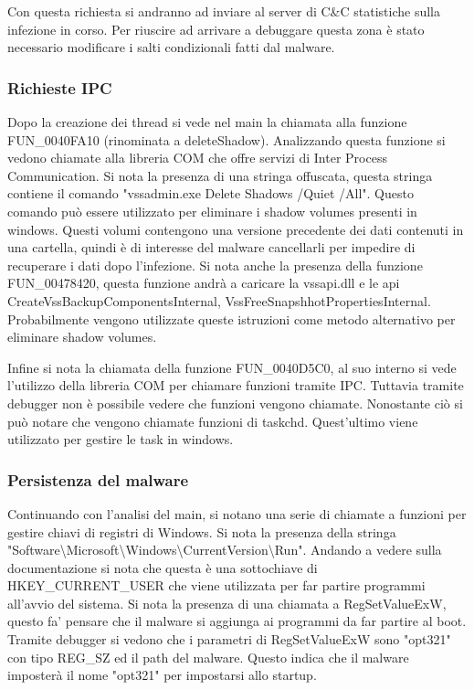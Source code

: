 \documentclass[a4paper,12pt]{article}
\begin{document}
Con questa richiesta si andranno ad inviare al server di C\&C statistiche sulla infezione in corso. Per riuscire ad arrivare a debuggare questa zona è stato necessario modificare i salti condizionali fatti dal malware.

\subsubsection{Richieste IPC}
Dopo la creazione dei thread si vede nel main la chiamata alla funzione FUN\_0040FA10 (rinominata a deleteShadow). Analizzando questa funzione si vedono chiamate alla libreria COM che offre servizi di Inter Process Communication.  Si nota la presenza di una stringa offuscata, questa stringa contiene il comando "vssadmin.exe Delete Shadows /Quiet /All". Questo comando può essere utilizzato per eliminare i shadow volumes presenti in windows. Questi volumi contengono una versione precedente dei dati contenuti in una cartella, quindi è di interesse del malware cancellarli per impedire di recuperare i dati dopo l'infezione. Si nota anche la presenza della funzione FUN\_00478420, questa funzione andrà a caricare la vssapi.dll e le api CreateVssBackupComponentsInternal, VssFreeSnapshhotPropertiesInternal. Probabilmente vengono utilizzate queste istruzioni come metodo alternativo per eliminare shadow volumes. 

Infine si nota la chiamata della funzione FUN\_0040D5C0, al suo interno si vede l'utilizzo della libreria COM per chiamare funzioni tramite IPC. Tuttavia tramite debugger non è possibile vedere che funzioni vengono chiamate. Nonostante ciò si può notare che vengono chiamate funzioni di taskchd. Quest'ultimo viene utilizzato per gestire le task in windows. 
  
\subsubsection{Persistenza del malware}
Continuando con l'analisi del main, si notano una serie di chiamate a funzioni per gestire chiavi di registri di Windows. Si nota la presenza della stringa "Software\textbackslash Microsoft\textbackslash Windows\textbackslash CurrentVersion\textbackslash Run". Andando a vedere sulla documentazione si nota che questa è una sottochiave di HKEY\_CURRENT\_USER che viene utilizzata per far partire programmi all'avvio del sistema. Si nota la presenza di una chiamata a RegSetValueExW, questo fa' pensare che il malware si aggiunga ai programmi da far partire al boot. Tramite debugger si vedono che i parametri di RegSetValueExW sono "opt321" con tipo REG\_SZ ed il path del malware. Questo indica che il malware imposterà il nome "opt321" per impostarsi allo startup.
\end{document}
